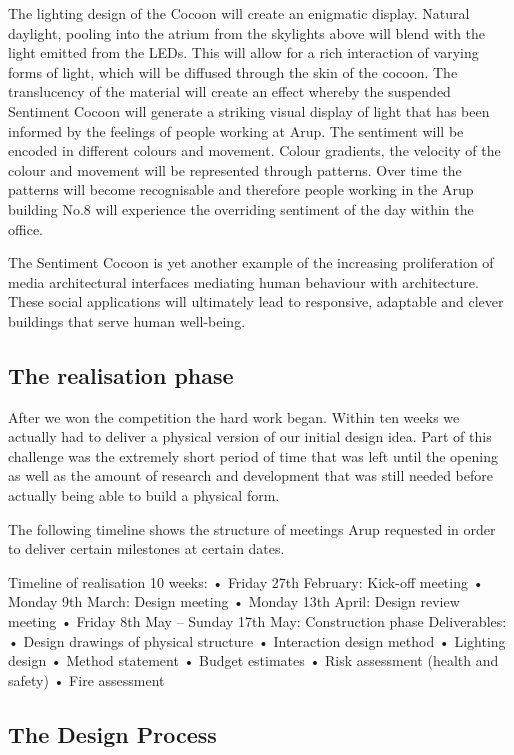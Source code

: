 The lighting design of the Cocoon will create an enigmatic display. Natural daylight, pooling into the atrium from the skylights above will blend with the light emitted from the LEDs. This will allow for a rich interaction of varying forms of light, which will be diffused through the skin of the cocoon. The translucency of the material will create an effect whereby the suspended Sentiment Cocoon will generate a striking visual display of light that has been informed by the feelings of people working at Arup.
The sentiment will be encoded in different colours and movement. Colour gradients, the velocity of the colour and movement will be represented through patterns. Over time the patterns will become recognisable and therefore people working in the Arup building No.8 will experience the overriding sentiment of the day within the office.

The Sentiment Cocoon is yet another example of the increasing proliferation of media architectural interfaces mediating human behaviour with architecture. These social applications will ultimately lead to responsive, adaptable and clever buildings that serve human well-being.

\subsection{The realisation phase}

After we won the competition the hard work began. Within ten weeks we actually had to deliver a physical version of our initial design idea. Part of this challenge was the extremely short period of time that was left until the opening as well as the amount of research and development that was still needed before actually being able to build a physical form. 

The following timeline shows the structure of meetings Arup requested in order to deliver certain milestones at certain dates.

Timeline of realisation 10 weeks:
•	Friday 27th February: Kick-off meeting
•	Monday 9th March: Design meeting
•	Monday 13th April: Design review meeting
•	Friday 8th May – Sunday 17th May: Construction phase
Deliverables:
•	Design drawings of physical structure
•	Interaction design method
•	Lighting design 
•	Method statement
•	Budget estimates
•	Risk assessment (health and safety) 
•	Fire assessment

\subsection{The Design Process}

